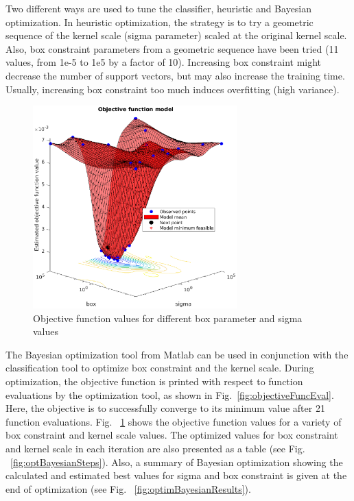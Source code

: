 Two different ways are used to tune the classifier, heuristic and Bayesian optimization. In heuristic optimization, the strategy is to try a geometric sequence of the kernel scale (sigma parameter) scaled at the original kernel scale.  
Also, box constraint parameters from a geometric sequence have been tried (11 values, from 1e-5 to 1e5 by a factor of 10). Increasing box constraint might decrease the number of support vectors, but may also increase the training time. 
Usually, increasing box constraint too much induces overfitting (high variance). 

\begin{figure}
\begin{center}
\includegraphics[width=0.7\textwidth]{figures/objFuncModel}    %
\caption{Objective function values for different box parameter and sigma values} 
\label{fig:objFuncModel}
\end{center}
\end{figure}


The Bayesian optimization tool from Matlab can be used in conjunction with the classification tool to optimize box constraint and the kernel scale. 
During optimization, the objective function is printed with respect to function evaluations by the optimization tool, as shown in Fig.~\ref{fig:objectiveFuncEval}. Here, the objective is to successfully converge to its minimum value after 21 function evaluations.
Fig. ~\ref{fig:objFuncModel} shows the objective function values for a variety of box constraint and kernel scale values. 
The optimized values for box constraint and kernel scale in each iteration are also presented as a table (see Fig. ~\ref{fig:optBayesianSteps}). 
Also, a summary of Bayesian optimization showing the calculated and estimated best values for sigma and box constraint is given at the end of optimization (see Fig. ~\ref{fig:optimBayesianResults}).

